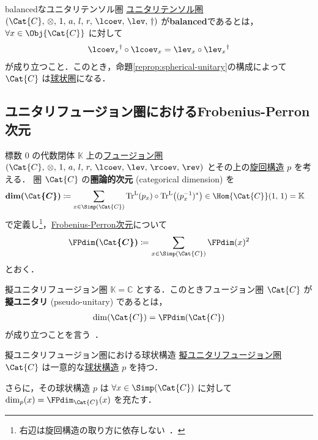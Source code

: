 \documentclass[TQFT_main]{subfiles}
\begin{document}
\begin{mydef}[label=redef:ev-coev-balanced]{balancedなユニタリテンソル圏}
    \hyperref[reredef:unitary-monoidal]{ユニタリ}\hyperref[def:tensorfusion-cat]{テンソル圏} $(\Cat{C},\, \otimes,\, 1,\, a,\, l,\, r,\, \lcoev,\, \lev,\, \dagger)$ 
    が\textbf{balanced}であるとは，$\forall x \in \Obj{\Cat{C}}$ に対して
    \begin{align}
        \lcoev_x{}^\dagger \circ \lcoev_x = \lev_x \circ \lev_x{}^\dagger
    \end{align}
    が成り立つこと．このとき，命題\ref{reprop:spherical-unitary}の構成によって $\Cat{C}$ は\hyperref[def:spherical]{球状圏}になる．
\end{mydef}

\subsection{ユニタリフュージョン圏におけるFrobenius-Perron次元}

標数 $0$ の代数閉体 $\mathbb{K}$ 上の\hyperref[def:tensorfusion-cat]{フュージョン圏} $(\Cat{C},\, \otimes,\, 1,\, a,\, l,\, r,\, \lcoev,\, \lev,\, \rcoev,\, \rev)$ とその上の\hyperref[def:pivotal]{旋回構造} $p$ を考える．
圏 $\Cat{C}$ の\textbf{圏論的次元} (categorical dimension) を
\begin{align}
    \label{def:categorialTr}
    \bm{\dim (\Cat{C})} &\coloneqq \sum_{x \in \Simp(\Cat{C})} \Tr^{\mathrm{L}} (p_x) \circ \Tr^{\mathrm{L}} \bigl( (p_x^{-1})^* \bigr) \in \Hom{\Cat{C}}(1,\, 1) = \mathbb{K}
\end{align}
で定義し\footnote{右辺は旋回構造の取り方に依存しない~\cite[p.179]{etingof2015tensor}．}，\hyperref[def:FPdim]{Frobenius-Perron次元}について
\begin{align}
    \bm{\FPdim (\Cat{C})} \coloneqq \sum_{x \in \Simp(\Cat{C})} \FPdim (x)^2
\end{align}
とおく．

\begin{mydef}[label=def:pseudo-unitary]{擬ユニタリフュージョン圏}
    $\mathbb{K} = \mathbb{C}$ とする．このときフュージョン圏 $\Cat{C}$ が\textbf{擬ユニタリ} (pseudo-unitary) であるとは，
    \begin{align}
        \dim (\Cat{C}) = \FPdim (\Cat{C})
    \end{align}
    が成り立つことを言う~\cite[DEFINITION 9.4.4., p.283]{etingof2015tensor}．
\end{mydef}

\begin{myprop}[label=prop:pseudo-unitary]{擬ユニタリフュージョン圏における球状構造}
    \hyperref[def:pseudo-unitary]{擬ユニタリフュージョン圏} $\Cat{C}$ は一意的な\hyperref[def:spherical]{球状構造} $p$ を持つ．
    
    さらに，その球状構造 $p$ は $\forall x \in \Simp(\Cat{C})$ に対して $\dim_p (x) = \FPdim_{\Cat{C}} (x)$ を充たす．
\end{myprop}
\end{document}
